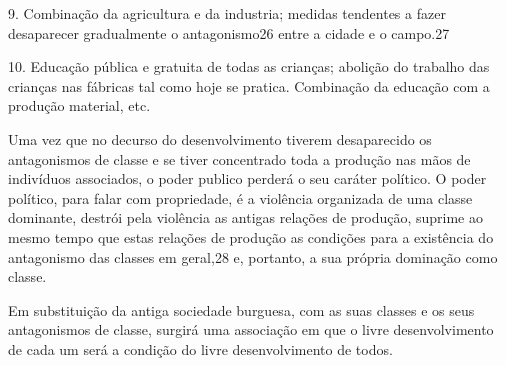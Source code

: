 9. Combinação da agricultura e da industria; medidas tendentes a fazer
desaparecer gradualmente o antagonismo26 entre a cidade e o campo.27

10. Educação pública e gratuita de todas as crianças; abolição do
trabalho das crianças nas fábricas tal como hoje se
pratica. Combinação da educação com a produção material, etc.

Uma vez que no decurso do desenvolvimento tiverem desaparecido os
antagonismos de classe e se tiver concentrado toda a produção nas mãos
de indivíduos associados, o poder publico perderá o seu caráter
político. O poder político, para falar com propriedade, é a violência
organizada de uma classe dominante, destrói pela violência as antigas
relações de produção, suprime ao mesmo tempo que estas relações de
produção as condições para a existência do antagonismo das classes em
geral,28 e, portanto, a sua própria dominação como classe.

Em substituição da antiga sociedade burguesa, com as suas classes e os
seus antagonismos de classe, surgirá uma associação em que o livre
desenvolvimento de cada um será a condição do livre desenvolvimento de
todos.

\fim
